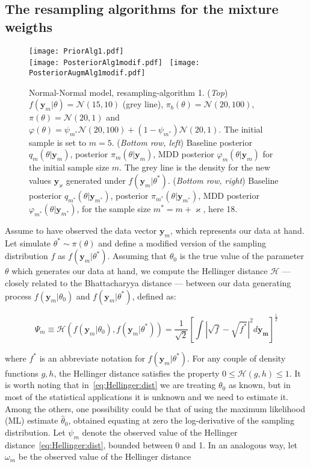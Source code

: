 \documentclass{statsoc}
\begin{document}
\subsection{The resampling algorithms for the mixture weigths}
\label{sec:alg}

\begin{figure}
\centering
\texttt{[image: PriorAlg1.pdf]}\\
\texttt{[image: PosteriorAlg1modif.pdf]}~
\texttt{[image: PosteriorAugmAlg1modif.pdf]}
\caption{Normal-Normal model, resampling-algorithm 1. (\textit{Top})  $f(\bm{y}_{m}|\theta)=\mathcal{N}(15,10)$ (grey line),  $\pi_{b}(\theta)=\mathcal{N}(20,100)$, $\pi(\theta)=\mathcal{N}(20,1)$ and $\varphi(\theta)=\psi_{m^{*}}\mathcal{N}(20,100)+(1-\psi_{m^{*}})\mathcal{N}(20,1)$. The initial sample is set to $m=5$. (\textit{Bottom row, left}) Baseline posterior $q_{m}(\theta|\bm{y}_{m})$, posterior $\pi_{m}(\theta|\bm{y}_{m})$, MDD posterior $\varphi_{m}(\theta|\bm{y}_{m})$ for the initial sample size $m $. The grey line is the density for the new values $\bm{y}_{\varkappa}$ generated under $f(\bm{y}_{m}| \theta^{*})$. (\textit{Bottom row, right}) Baseline posterior $q_{m^{*}}(\theta|\bm{y}_{m^{*}})$, posterior $\pi_{m^{*}}(\theta|\bm{y}_{m^{*}})$, MDD posterior $\varphi_{m^{*}}(\theta|\bm{y}_{m^{*}})$, for the sample size $m^{*}=m+\varkappa $, here 18.}
\label{normal_mixture}
\end{figure}

Assume to have observed the 
data vector $\bm{y}_{m}$, which represents our data at hand. Let simulate $\theta^{*} \sim \pi
(\theta)$ and define a modified version of the sampling distribution $f$ as $f(\bm{y}_{m}|\theta^{*})$. Assuming that $\theta_{0}$ is the true value of the parameter $\theta$ which generates our data at hand,  we compute the Hellinger distance $\mathcal{H}$ ---closely related to the Bhattacharyya distance   \citep{bhattacharyya1946measure}---  between our data generating process $f(\bm{y}_{m}| \theta_{0})$ and $f(\bm{y}_{m}|\theta^{*})$, defined as:

\begin{equation}
\Psi_{m} \equiv \mathcal{H}( f(\bm{y}_{m}|\theta_{0}), f(\bm{y}_{m}|\theta^{*}))=\frac{1}{\sqrt{2}} \left[ \int |\sqrt{f}-\sqrt{f^{*}}|^{2}d\bm{y_{m}} \right]^{\frac{1}{2}}
\label{eq:Hellinger:dist}
\end{equation}

where  $f^{*}$ is an abbreviate notation for $f(\bm{y}_{m}|\theta^{*})$. For any couple of density functions $g, h$, the Hellinger distance satisfies the property $0 \le \mathcal{H}(g,h) \le 1$.  It is worth noting that in~\eqref{eq:Hellinger:dist} we are treating $\theta_{0}$ as known, but in most of the statistical applications it is unknown and we need to estimate it. Among the others, one possibility could be that of using the maximum likelihood (ML) estimate $\hat{\theta}_{0}$, obtained equating at zero the log-derivative of the sampling distribution. Let $\psi_{m}$ denote the observed value of the Hellinger distance~\eqref{eq:Hellinger:dist}, bounded between 0 and 1. In an analogous way, let $\omega_{m}$ be the observed value of the Hellinger distance 
\end{document}
